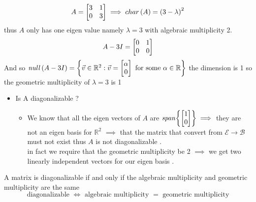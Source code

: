 \documentclass[11pt]{book}
\begin{document}
\begin{eg}
    \[
        A= \begin{bmatrix} 3 & 1 \\ 0 & 3 \end{bmatrix} \implies char\left(A\right) = \left( 3 - \lambda  \right) ^2     
    \]
    thus $A$ only has one eigen value namely $\lambda = 3$ with algebraic multiplicity 2.
    \[
    A - 3I= \begin{bmatrix} 0 & 1 \\ 0 & 0 \end{bmatrix}
    \]
    And so $\mathit{null} \left(A - 3I\right) = \left\{ \vec{v} \in \mathbb{R} ^2 :\vec{v} = \begin{bmatrix} \alpha  \\ 0 \end{bmatrix} \text{ for some } \alpha \in \mathbb{R}  \right\} $ the dimension is 1 so the geometric multiplicity of $\lambda = 3$ is 1 
    \begin{itemize}
        \item Is A diagonalizable ?
            \begin{itemize}
                \item We know that all the eigen vectors of $A$ are $\mathit{span} {\left\{ \begin{bmatrix} 1 \\ 0 \end{bmatrix}  \right\} } \implies $ they are not an eigen basis for $\mathbb{R} ^2 $ $\implies$ that the matrix that convert from $\mathcal{E} \to \mathcal{B} $ must not exist thus $A$ is not diagonalizable .  \\
                in fact we require that the geometric multiplicity be 2 $\implies$ we get two linearly independent vectors for our eigen basis .
            \end{itemize}
    \end{itemize}
\end{eg}

\begin{thm}\label{thm:diagonalizable_and_multiplicities}
    A matrix is diagonalizable if and only if the algebraic multiplicity and geometric multiplicity are the same
    \[
    \boxed{\text{ diagonalizable }  \Leftrightarrow \text{ algebraic multiplicity  } = \text{ geometric multiplicity  } }
    \]
\end{thm}
\end{document}
